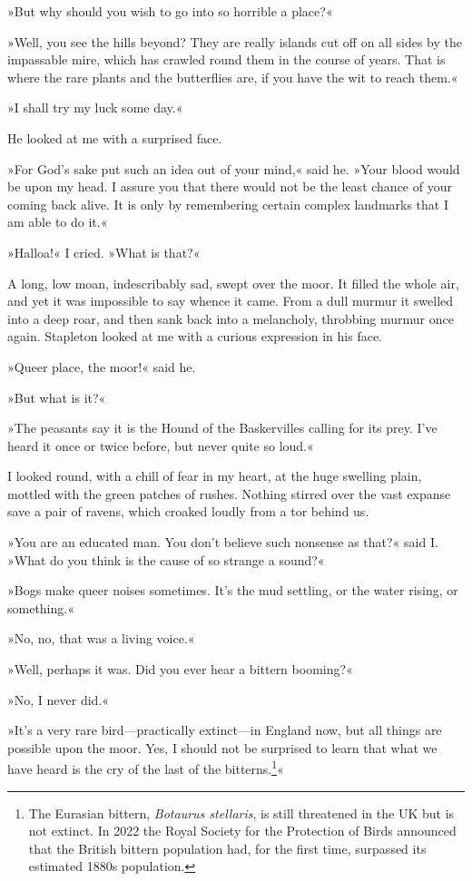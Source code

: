 \afterpage{\clearpage}

»But why should you wish to go into so horrible a place?«

»Well, you see the hills beyond? They are really islands cut off on all sides by the impassable mire, which has crawled round them in the course of years. That is where the rare plants and the butterflies are, if you have the wit to reach them.«

»I shall try my luck some day.«

He looked at me with a surprised face.

»For God's sake put such an idea out of your mind,« said he. »Your blood would be upon my head. I assure you that there would not be the least chance of your coming back alive. It is only by remembering certain complex landmarks that I am able to do it.«

»Halloa!« I cried. »What is that?«

A long, low moan, indescribably sad, swept over the moor. It filled the whole air, and yet it was impossible to say whence it came. From a dull murmur it swelled into a deep roar, and then sank back into a melancholy, throbbing murmur once again. Stapleton looked at me with a curious expression in his face.

»Queer place, the moor!« said he.

»But what is it?«

»The peasants say it is the Hound of the Baskervilles calling for its prey. I've heard it once or twice before, but never quite so loud.«

I looked round, with a chill of fear in my heart, at the huge swelling plain, mottled with the green patches of rushes. Nothing stirred over the vast expanse save a pair of ravens, which croaked loudly from a tor behind us.

»You are an educated man. You don't believe such nonsense as that?« said I. »What do you think is the cause of so strange a sound?«

»Bogs make queer noises sometimes. It's the mud settling, or the water rising, or something.«

»No, no, that was a living voice.«

»Well, perhaps it was. Did you ever hear a bittern booming?«

»No, I never did.«

»It's a very rare bird—practically extinct—in England now, but all things are possible upon the moor. Yes, I should not be surprised to learn that what we have heard is the cry of the last of the bitterns.\footnote{The Eurasian bittern, \textit{Botaurus stellaris}, is still threatened in the UK but is not extinct. In 2022 the Royal Society for the Protection of Birds announced that the British bittern population had, for the first time, surpassed its estimated 1880s population.}«

